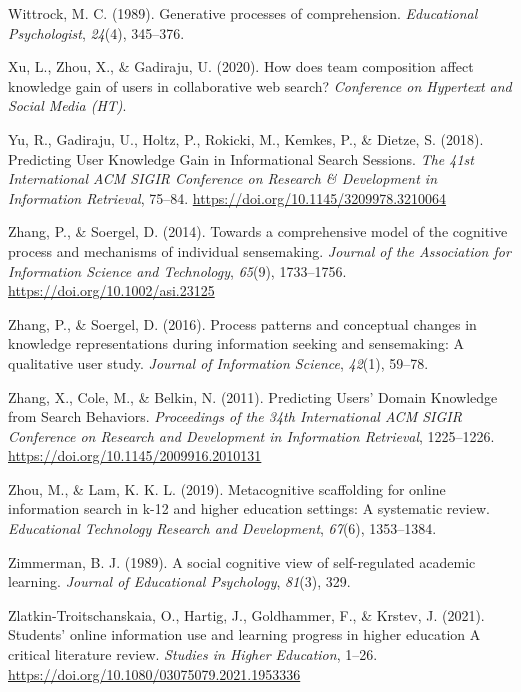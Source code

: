 \documentclass[letterpaper, nobind]{templates/ociamthesis}
\newlength{\cslhangindent}
\newenvironment{CSLReferences}[2] %
 {%
  \setlength{\parindent}{0pt}
  \ifodd #1
  \let\oldpar\par
  \def\par{\hangindent=\cslhangindent\oldpar}
  \fi
  \setlength{\parskip}{1mm}
  \setlength{\baselineskip}{6mm}
 }%
 {}
\begin{document}
\begin{CSLReferences}{1}{0}
\leavevmode{}%
Wittrock, M. C. (1989). Generative processes of comprehension. \emph{Educational Psychologist}, \emph{24}(4), 345--376.

\leavevmode{}%
Xu, L., Zhou, X., \& Gadiraju, U. (2020). How does team composition affect knowledge gain of users in collaborative web search? \emph{Conference on Hypertext and Social Media (HT)}.

\leavevmode{}%
Yu, R., Gadiraju, U., Holtz, P., Rokicki, M., Kemkes, P., \& Dietze, S. (2018). Predicting {User Knowledge Gain} in {Informational Search Sessions}. \emph{The 41st {International ACM SIGIR Conference} on {Research} \& {Development} in {Information Retrieval}}, 75--84. \url{https://doi.org/10.1145/3209978.3210064}

\leavevmode{}%
Zhang, P., \& Soergel, D. (2014). Towards a comprehensive model of the cognitive process and mechanisms of individual sensemaking. \emph{Journal of the Association for Information Science and Technology}, \emph{65}(9), 1733--1756. \url{https://doi.org/10.1002/asi.23125}

\leavevmode{}%
Zhang, P., \& Soergel, D. (2016). Process patterns and conceptual changes in knowledge representations during information seeking and sensemaking: A qualitative user study. \emph{Journal of Information Science}, \emph{42}(1), 59--78.

\leavevmode{}%
Zhang, X., Cole, M., \& Belkin, N. (2011). Predicting {Users}' {Domain Knowledge} from {Search Behaviors}. \emph{Proceedings of the 34th {International ACM SIGIR Conference} on {Research} and {Development} in {Information Retrieval}}, 1225--1226. \url{https://doi.org/10.1145/2009916.2010131}

\leavevmode{}%
Zhou, M., \& Lam, K. K. L. (2019). Metacognitive scaffolding for online information search in k-12 and higher education settings: A systematic review. \emph{Educational Technology Research and Development}, \emph{67}(6), 1353--1384.

\leavevmode{}%
Zimmerman, B. J. (1989). A social cognitive view of self-regulated academic learning. \emph{Journal of Educational Psychology}, \emph{81}(3), 329.

\leavevmode{}%
Zlatkin-Troitschanskaia, O., Hartig, J., Goldhammer, F., \& Krstev, J. (2021). Students' online information use and learning progress in higher education \textendash{} {A} critical literature review. \emph{Studies in Higher Education}, 1--26. \url{https://doi.org/10.1080/03075079.2021.1953336}

\end{CSLReferences}

\end{document}
